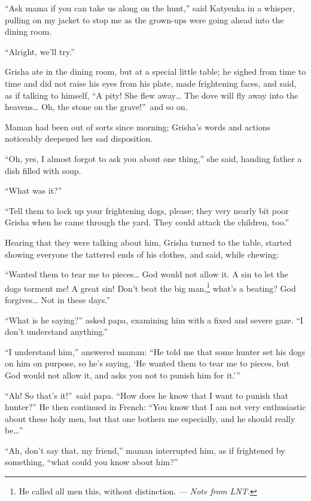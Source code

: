 ``Ask mama if you can take us along on the hunt,'' said Katyenka in a whisper, pulling on my jacket to stop me as the grown-ups were going ahead into the dining room. %

``Alright, we'll try.'' %

Grisha ate in the dining room, but at a special little table; he sighed from time to time and did not raise his eyes from his plate, made frightening faces, and said, as if talking to himself, ``A pity! She flew away\ldots{} The dove will fly away into the heavens\ldots{} Oh, the stone on the grave!''~and so on. %

Maman had been out of sorts since morning; Grisha's words and actions noticeably deepened her sad disposition. 

``Oh, yes, I almost forgot to ask you about one thing,'' she said, handing father a dish filled with soup. %

``What was it?'' %

``Tell them to lock up your frightening dogs, please; they very nearly bit poor Grisha when he came through the yard. They could attack the children, too.'' %

Hearing that they were talking about him, Grisha turned to the table, started showing everyone the tattered ends of his clothes, and said, while chewing:

``Wanted them to tear me to pieces\ldots{} God would not allow it. A sin to let the dogs torment me! A great sin! Don't beat the big man,\footnote{He called all men this, without distinction. --- \textit{Note from LNT.}} what's a beating? God forgives\ldots{} Not in these days.'' %

``What is he saying?'' asked papa, examining him with a fixed and severe gaze. ``I don't understand anything.'' %

``I understand him,'' answered maman: ``He told me that some hunter set his dogs on him on purpose, so he's saying, `He wanted them to tear me to pieces, but God would not allow it, and asks you not to punish him for it.''' %

``Ah! So that's it!''~said papa. ``How does he know that I want to punish that hunter?'' He then continued in French: ``You know that I am not very enthusiastic about these holy men, but that one bothers me especially, and he should really be\ldots{}'' %

``Ah, don't say that, my friend,'' maman interrupted him, as if frightened by something, ``what could you know about him?'' %


